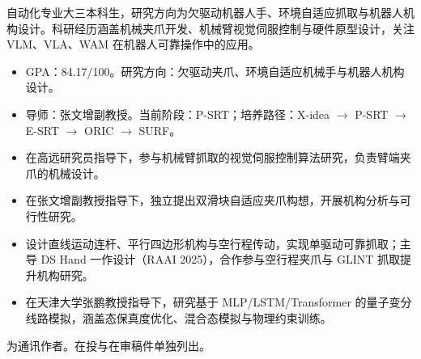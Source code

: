 \documentclass[10pt,a4paper,fontset=none]{ctexart}
\begin{document}

自动化专业大三本科生，研究方向为欠驱动机器人手、环境自适应抓取与机器人机构设计。科研经历涵盖机械夹爪开发、机械臂视觉伺服控制与硬件原型设计，关注 VLM、VLA、WAM 在机器人可靠操作中的应用。

\begin{itemize}
  \item GPA：84.17/100。研究方向：欠驱动夹爪、环境自适应机械手与机器人机构设计。
\end{itemize}
\vspace{3pt}
\begin{itemize}
  \item 导师：张文增副教授。当前阶段：P-SRT；培养路径：X-idea $\rightarrow$ P-SRT $\rightarrow$ E-SRT $\rightarrow$ ORIC $\rightarrow$ SURF。
\end{itemize}

\begin{itemize}
  \item 在高远研究员指导下，参与机械臂抓取的视觉伺服控制算法研究，负责臂端夹爪的机械设计。
\end{itemize}
\vspace{3pt}
\begin{itemize}
  \item 在张文增副教授指导下，独立提出双滑块自适应夹爪构想，开展机构分析与可行性研究。
  \item 设计直线运动连杆、平行四边形机构与空行程传动，实现单驱动可靠抓取；主导 DS Hand 一作设计（RAAI 2025），合作参与空行程夹爪与 GLINT 抓取提升机构研究。
\end{itemize}
\vspace{3pt}
\begin{itemize}
  \item 在天津大学张鹏教授指导下，研究基于 MLP/LSTM/Transformer 的量子变分线路模拟，涵盖态保真度优化、混合态模拟与物理约束训练。
\end{itemize}

{\fontsize{8}{10}\selectfont * 为通讯作者。在投与在审稿件单独列出。}\par
{}
\end{document}
